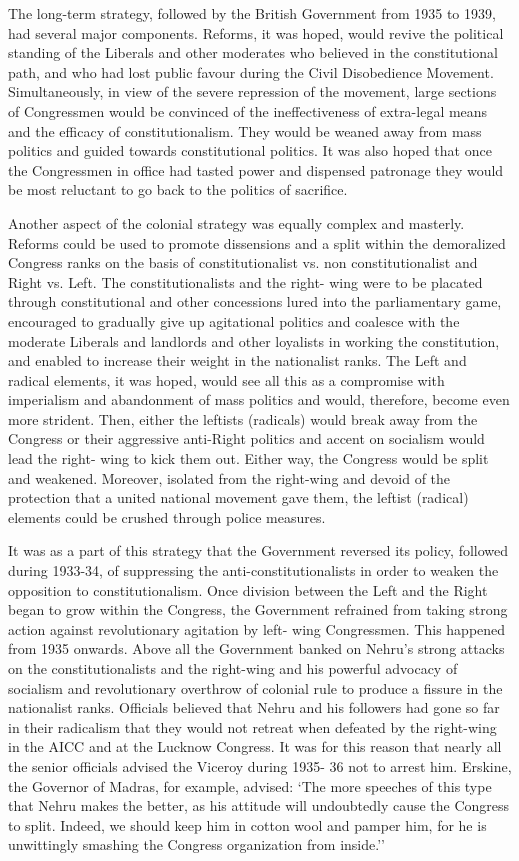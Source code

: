 The long-term strategy, followed by the British Government from 1935 to 1939, had several major components. Reforms, it was hoped, would revive the political standing of the Liberals and other moderates who believed in the constitutional path, and who had lost public favour during the Civil Disobedience Movement. Simultaneously, in view of the severe repression of the movement, large sections of Congressmen would be convinced of the ineffectiveness of extra-legal means and the efficacy of constitutionalism. They would be weaned away from mass politics and guided towards constitutional politics. It was also hoped that once the Congressmen in office had tasted power and dispensed patronage they would be most reluctant to go back to the politics of sacrifice. 

Another aspect of the colonial strategy was equally complex and masterly. Reforms could be used to promote dissensions and a split within the demoralized Congress ranks on the basis of constitutionalist vs. non constitutionalist and Right vs. Left. The constitutionalists and the right- wing were to be placated through constitutional and other concessions lured into the parliamentary game, encouraged to gradually give up agitational politics and coalesce with the moderate Liberals and landlords and other loyalists in working the constitution, and enabled to increase their weight in the nationalist ranks. The Left and radical elements, it was hoped, would see all this as a compromise with imperialism and abandonment of mass politics and would, therefore, become even more strident. Then, either the leftists (radicals) would break away from the Congress or their aggressive anti-Right politics and accent on socialism would lead the right- wing to kick them out. Either way, the Congress would be split and weakened. Moreover, isolated from the right-wing and devoid of the protection that a united national movement gave them, the leftist (radical) elements could be crushed through police measures. 

It was as a part of this strategy that the Government reversed its policy, followed during 1933-34, of suppressing the anti-constitutionalists in order to weaken the opposition to constitutionalism. Once division between the Left and the Right began to grow within the Congress, the Government refrained from taking strong action against revolutionary agitation by left- wing Congressmen. This happened from 1935 onwards. Above all the Government banked on Nehru's strong attacks on the constitutionalists and the right-wing and his powerful advocacy of socialism and revolutionary overthrow of colonial rule to produce a fissure in the nationalist ranks. Officials believed that Nehru and his followers had gone so far in their radicalism that they would not retreat when defeated by the right-wing in the AICC and at the Lucknow Congress. It was for this reason that nearly all the senior officials advised the Viceroy during 1935- 36 not to arrest him. Erskine, the Governor of Madras, for example, advised: `The more speeches of this type that Nehru makes the better, as his attitude will undoubtedly cause the Congress to split. Indeed, we should keep him in cotton wool and pamper him, for he is unwittingly smashing the Congress organization from inside.'' 

